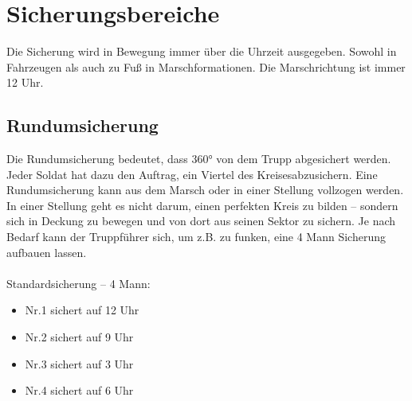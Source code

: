 \newpage

\section{Sicherungsbereiche}
	Die Sicherung wird in Bewegung immer über die Uhrzeit ausgegeben. Sowohl in Fahrzeugen als auch zu Fuß in Marschformationen.  Die Marschrichtung ist immer 12 Uhr. \\

\subsection{Rundumsicherung}
	Die Rundumsicherung bedeutet, dass 360° von dem Trupp abgesichert werden. Jeder Soldat hat dazu den Auftrag, ein Viertel des \glqq Kreises\grqq\space abzusichern. Eine Rundumsicherung kann aus dem Marsch oder in einer Stellung vollzogen werden. In einer Stellung geht es nicht darum, einen perfekten Kreis zu bilden – sondern sich in Deckung zu bewegen und von dort aus seinen Sektor zu sichern. Je nach Bedarf kann der Truppführer sich, um z.B. zu funken, eine 4 Mann Sicherung aufbauen lassen.\\\\
	Standardsicherung  – 4 Mann: 
		\begin{itemize}
			\item Nr.1 sichert auf 12 Uhr 
			\item Nr.2 sichert auf 9 Uhr 
			\item Nr.3 sichert auf 3 Uhr 
			\item Nr.4 sichert auf 6 Uhr 
		\end{itemize}

